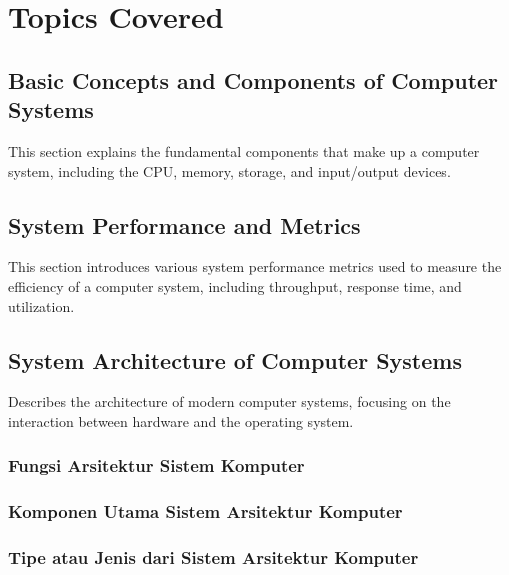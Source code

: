 \documentclass[12pt]{article}
\begin{document}
\section{Topics Covered}

\subsection{Basic Concepts and Components of Computer Systems}
This section explains the fundamental components that make up a computer system, including the CPU, memory, storage, and input/output devices.

\subsection{System Performance and Metrics}
This section introduces various system performance metrics used to measure the efficiency of a computer system, including throughput, response time, and utilization.

\subsection{System Architecture of Computer Systems}
Describes the architecture of modern computer systems, focusing on the interaction between hardware and the operating system.

\subsubsection{Fungsi Arsitektur Sistem Komputer }
\subsubsection{Komponen Utama Sistem Arsitektur Komputer }
\subsubsection{Tipe atau Jenis dari Sistem Arsitektur Komputer }
\end{document}
